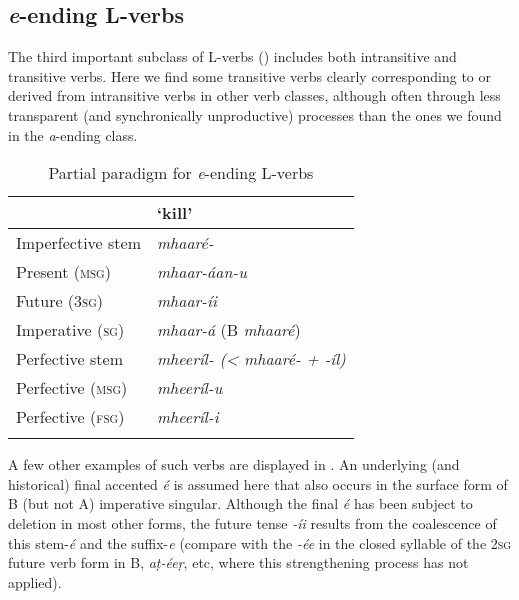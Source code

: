 \subsection{\textit{e}-ending L-verbs}
\label{subsec:8-3-3}


The third important subclass of L-verbs () includes both intransitive and transitive verbs. Here we find some transitive verbs clearly corresponding to or derived from intransitive verbs in other verb classes, although often through less transparent (and synchronically unproductive) processes than the ones we found in the \textit{a}-ending class.


\begin{table}[ht]
\caption{Partial paradigm for \textit{e}-ending L-verbs}
\begin{tabularx}{.75\textwidth}{ Q Q }
\lsptoprule
&
`kill'\\\midrule
Imperfective stem &
\textit{mhaaré-}\\
Present (\textsc{msg}) &
\textit{mhaar-áan-u} \\
Future (\textsc{3sg}) &
\textit{mhaar-íi} \\
Imperative (\textsc{sg}) &
\textit{mhaar-á} (B \textit{mhaaré})\\
Perfective stem &
\textit{mheeríl- ({\textless} mhaaré- + -íl)}\\
Perfective (\textsc{msg}) &
\textit{mheeríl-u} \\
Perfective (\textsc{fsg}) &
\textit{mheeríl-i} \\\lspbottomrule
\end{tabularx}
\label{tab:8-6}
\end{table}


A few other examples of such verbs are displayed in . An underlying (and historical) final accented \textit{é} is assumed here that also occurs in the surface form of B (but not A) imperative singular. Although the final \textit{é} has been subject to deletion in most other forms, the future tense \textit{-íi} results from the coalescence of this stem-\textit{é} and the suffix-\textit{e} (compare with the \textit{-ée} in the closed syllable of the \textsc{2sg} future verb form in B, \textit{aṭ-éeṛ}, etc, where this strengthening process has not applied).


